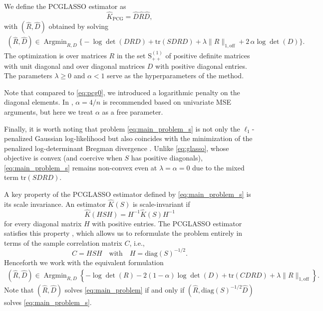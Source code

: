 \documentclass[12pt]{amsart}
\numberwithin{equation}{section}
\numberwithin{equation}{section}
\theoremstyle{plain}
\theoremstyle{definition}
\DeclareMathOperator*{\Argmin}{\mathrm{Arg}\min}
\newcommand{\tr}{\mathrm{tr}}
\newcommand{\diag}[1]{\mathrm{diag}(#1)}
\newcommand{\Sppone}{\mathrm{S}_{++}^{(1)}}
\begin{document}
We define the PCGLASSO estimator as
\[
\hat{K}_{\mathrm{PCG}} =  \hat{D}\hat{R}\hat{D},
\]
with $(\hat{R},\hat{D})$ obtained by solving 
\begin{align}\label{eq:main_problem_s}
    (\hat{R},\hat{D}) \in \Argmin_{R,D} \Big\{ -\log\det(DRD) + \tr(S D R D) +  \lambda\| R\|_{1,\mathrm{off}} +2\,\alpha\log\det(D) \Big\}.
\end{align}
The optimization is over matrices $R$ in the set $\Sppone$ of positive definite matrices with unit diagonal and over diagonal matrices $D$ with positive diagonal entries. The parameters $\lambda\geq0$ and $\alpha<1$ serve as the hyperparameters of the method. 

Note that compared to \eqref{eq:pcg0}, we introduced a logarithmic penalty on the diagonal elements. In \cite{Carter}, $\alpha = 4/n$ is recommended based on univariate MSE arguments, but here we treat $\alpha$ as a free parameter.

Finally, it is worth noting that problem \eqref{eq:main_problem_s} is not only the $\ell_1$-penalized Gaussian log-likelihood but also coincides with the minimization of the penalized log-determinant Bregman divergence  \cite{ravikumar2011graphical,zwiernik2023entropic}. Unlike \eqref{eq:glasso}, whose objective is convex (and coercive when $S$ has positive diagonals), \eqref{eq:main_problem_s} remains non-convex even at $\lambda=\alpha=0$ due to the mixed term $\tr(S D R D)$.

A key property of the PCGLASSO estimator defined by \eqref{eq:main_problem_s} is its scale invariance. An estimator $\hat{K}(S)$ is scale-invariant if 
\[
\hat{K}(H S H) = H^{-1} \hat{K}(S) H^{-1}
\]
for every diagonal matrix $H$ with positive entries.
The PCGLASSO estimator satisfies this property \cite[Proposition 2]{Carter}, which allows us to reformulate the problem entirely in terms of the sample correlation matrix $C$, i.e.,
\[
C = H S H \quad \text{with} \quad H = \diag{S}^{-1/2}.
\]
Henceforth we work with the equivalent formulation
\begin{align}\label{eq:main_problem}
    (\hat{R},\hat{D}) \in \Argmin_{R,D} \left\{-\log\det(R)-2(1-\alpha)\log\det(D) +\tr( C DRD)+ \lambda \|R\|_{1,\mathrm{off}} \right\}.
\end{align}
Note that $(\hat{R},\hat{D})$ solves \eqref{eq:main_problem} if and only if $(\hat{R}, \diag{S}^{-1/2} \hat{D})$ solves \eqref{eq:main_problem_s}. 
\end{document}
